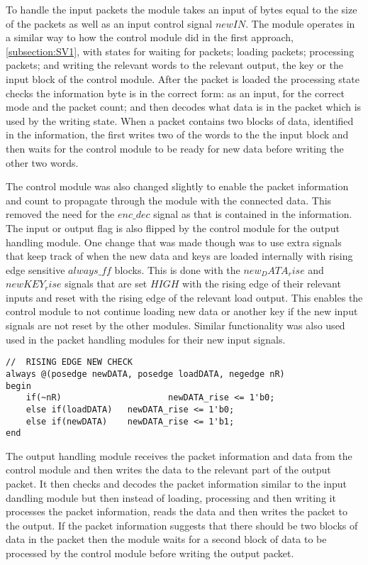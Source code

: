 \documentclass[12pt,twoside,a4paper]{report}
\begin{document}
	To handle the input packets the module takes an input of bytes equal to the size of the packets as well as an input control signal $newIN$. The module operates in a similar way to how the control module did in the first approach, \autoref{subsection:SV1}, with states for waiting for packets; loading packets; processing packets; and writing the relevant words to the relevant output, the key or the input block of the control module. After the packet is loaded the processing state checks the information byte is in the correct form: as an input, for the correct mode and the packet count; and then decodes what data is in the packet which is used by the writing state. When a packet contains two blocks of data, identified in the information, the first writes two of the words to the the input block and then waits for the control module to be ready for new data before writing the other two words.
	
	The control module was also changed slightly to enable the packet information and count to propagate through the module with the connected data. This removed the need for the $enc\_dec$ signal as that is contained in the information. The input or output flag is also flipped by the control module for the output handling module. One change that was made though was to use extra signals that keep track of when the new data and keys are loaded internally with rising edge sensitive $always\_ff$ blocks. This is done with the $new_DATA_rise$ and $newKEY_rise$ signals that are set $HIGH$ with the rising edge of their relevant inputs and reset with the rising edge of the relevant load output. This enables the control module to not continue loading new data or another key if the new input signals are not reset by the other modules. Similar functionality was also used used in the packet handling modules for their new input signals.

 	\begin{minipage}{\linewidth}
	\begin{lstlisting}[label={lst:new_rise},caption={The $always\_ff$ blocks used for risnig edge new data checks},style=CStyle]
//	RISING EDGE NEW CHECK
always @(posedge newDATA, posedge loadDATA, negedge nR)
begin
	if(~nR)						newDATA_rise <= 1'b0;
	else if(loadDATA)	newDATA_rise <= 1'b0;
	else if(newDATA)	newDATA_rise <= 1'b1;
end
	\end{lstlisting}
	\end{minipage}
	
	The output handling module receives the packet information and data from the control module and then writes the data to the relevant part of the output packet. It then checks and decodes the packet information similar to the input dandling module but then instead of loading, processing and then writing it processes the packet information, reads the data and then writes the packet to the output. If the packet information suggests that there should be two blocks of data in the packet then the module waits for a second block of data to be processed by the control module before writing the output packet.
    
\end{document}
